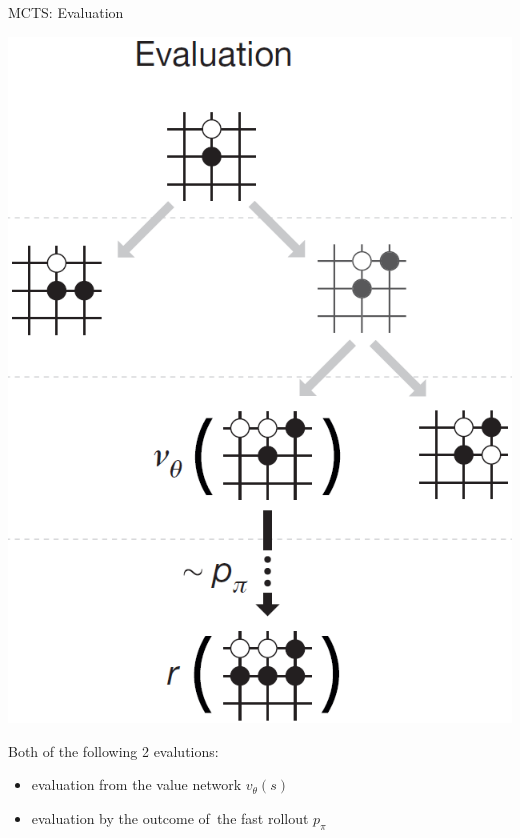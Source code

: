 \documentclass{beamer}
\begin{document}
{    \begin{frame}{MCTS: Evaluation}
      \begin{center}
        \includegraphics[height=.55\textheight]{../img/MCTS_evaluation.png}
      \end{center}
      \pause

      Both of the following 2 evalutions:
      \pause
      \begin{itemize}[<+- | alert@+>]
        \item evaluation from the value network $v_\theta (s)$
        \item evaluation by the outcome of~the fast rollout $p_\pi$
      \end{itemize}
      \pause
    \end{frame}

}
\end{document}
